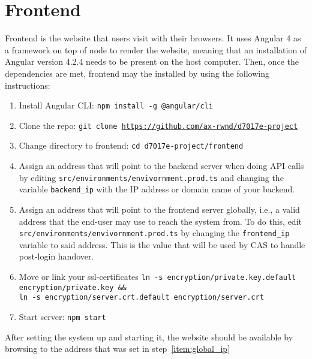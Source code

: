 \section{Frontend}
Frontend is the website that users visit with their browsers. It uses Angular 4 as a framework on top of node to render the website, meaning that an installation of Angular version 4.2.4 needs to be present on the host computer. Then, once the dependencies are met, frontend may the installed by using the following instructions:
\begin{enumerate}
    \item Install Angular CLI: \texttt{npm install -g @angular/cli}
    \item Clone the repo: \texttt{git clone \url{https://github.com/ax-rwnd/d7017e-project}}
    \item Change directory to frontend: \texttt{cd d7017e-project/frontend}
    \item Assign an address that will point to the backend server when doing API calls by editing \texttt{src/environments/envivornment.prod.ts} and changing the variable \texttt{backend\_ip} with the IP address or domain name of your backend.
    \item Assign an address that will point to the frontend server globally, i.e., a valid address that the end-user may use to reach the system from. To do this, edit \texttt{src/environments/envivornment.prod.ts} by changing the \texttt{frontend\_ip} variable to said address. This is the value that will be used by CAS to handle post-login handover.\label{item:global_ip}
    \item Move or link your ssl-certificates \texttt{ln -s encryption/private.key.default \\
    encryption/private.key \&\& \\
    ln -s encryption/server.crt.default encryption/server.crt}
    \item Start server: \texttt{npm start}
\end{enumerate}
After setting the system up and starting it, the website should be available by browsing to the address that was set in step~\ref{item:global_ip}
